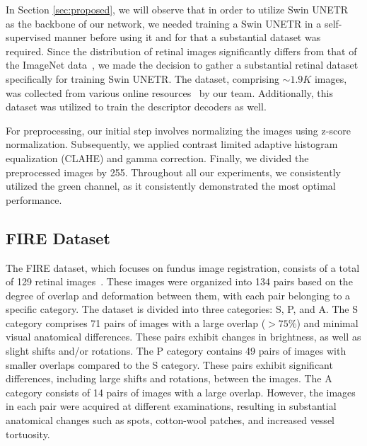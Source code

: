 \documentclass[10pt,twocolumn,letterpaper]{article}
\begin{document}
In Section \ref{sec:proposed}, we will observe that in order to utilize Swin UNETR~\cite{hatamizadeh2021swin} as the backbone of our network, we needed training a Swin UNETR in a self-supervised manner before using it and for that a substantial dataset was required. Since the distribution of retinal images significantly differs from that of the ImageNet data~\cite{deng2009imagenet}, we made the decision to gather a substantial retinal dataset specifically for training Swin UNETR. The dataset, comprising $\sim 1.9 K$ images, was collected from various online resources~\cite{KaggleDiabeticRetinopathy,KaggleGlaucomaDatasets, sarhan2021transfer,hernandez2017fire,RetinalDiseaseClassification} by our team. Additionally, this dataset was utilized to train the descriptor decoders as well.

For preprocessing, our initial step involves normalizing the images using z-score normalization. Subsequently, we applied contrast limited adaptive histogram equalization (CLAHE) and gamma correction. Finally, we divided the preprocessed images by 255. Throughout all our experiments, we consistently utilized the green channel, as it consistently demonstrated the most optimal performance.





\subsection{FIRE Dataset}

The FIRE dataset, which focuses on fundus image registration, consists of a total of 129 retinal images~\cite{hernandez2017fire}. These images were organized into 134 pairs based on the degree of overlap and deformation between them, with each pair belonging to a specific category. The dataset is divided into three categories: S, P, and A. The S category comprises 71 pairs of images with a large overlap ($>75\%$) and minimal visual anatomical differences. These pairs exhibit changes in brightness, as well as slight shifts and/or rotations. The P category contains 49 pairs of images with smaller overlaps compared to the S category. These pairs exhibit significant differences, including large shifts and rotations, between the images. The A category consists of 14 pairs of images with a large overlap. However, the images in each pair were acquired at different examinations, resulting in substantial anatomical changes such as spots, cotton-wool patches, and increased vessel tortuosity.
\end{document}
